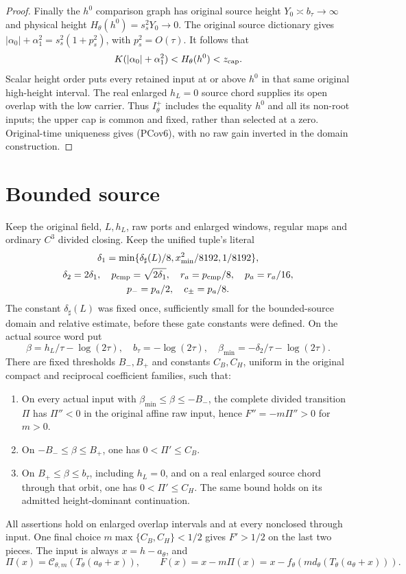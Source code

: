 \begin{proof}
Finally the $h^0$ comparison graph has original source height
$Y_0\asymp b_\tau\to\infty$ and physical height
$H_\theta(h^0)=s_s^2Y_0\to0$. The original source dictionary gives
$|\alpha_0|+\alpha_1^2=s_s^2(1+p_s^2)$, with $p_s^2=O(\tau)$.
It follows that
\[
 K(|\alpha_0|+\alpha_1^2)<H_\theta(h^0)<z_{\rm cap}.
\]
Scalar height order puts every retained input at or above $h^0$ in
that same original high-height interval. The real enlarged $h_L=0$
source chord supplies its open overlap with the low carrier. Thus
$I_\theta^+$ includes the equality $h^0$ and all its non-root inputs;
the upper cap is common and fixed, rather than selected at a zero.
Original-time uniqueness gives (PCov6), with no raw gain inverted in
the domain construction.
\end{proof}

\section{Bounded source}

\begin{lemma}
\label{p2:lem-bounded-source-budget}
Keep the original field, $L,h_L$, raw ports and enlarged windows, regular
maps and ordinary $C^3$ divided closing. Keep the unified tuple's literal
\[
 \begin{gathered}
 \delta_1=\min\{\delta_\sharp(L)/8,x_{\min}^2/8192,1/8192\},\\
 \delta_2=2\delta_1,\quad p_{\rm cmp}=\sqrt{2\delta_1},\quad r_a=p_{\rm cmp}/8,\quad p_a=r_a/16,\\
 p_-=p_a/2,\quad c_\pm=p_a/8.
 \end{gathered}
\]
The constant $\delta_\sharp(L)$ was fixed once, sufficiently small for
the bounded-source domain and relative estimate, before these gate
constants were defined. On the actual source word put
\[
 \beta=h_L/\tau-\log(2\tau),\quad b_\tau=-\log(2\tau),\quad
 \beta_{\min}=-\delta_2/\tau-\log(2\tau).
\]
There are fixed thresholds $B_-,B_+$ and constants $C_B,C_H$, uniform in
the original compact and reciprocal coefficient families, such that:
\begin{enumerate}
\item On every actual input with $\beta_{\min}\le\beta\le-B_-$,
the complete divided transition $\Pi$ has $\Pi''<0$ in the original
affine raw input, hence $F''=-m\Pi''>0$ for $m>0$.
\item On $-B_-\le\beta\le B_+$, one has $0<\Pi'\le C_B$.
\item On $B_+\le\beta\le b_\tau$, including $h_L=0$, and on a real
enlarged source chord through that orbit, one has $0<\Pi'\le C_H$.
The same bound holds on its admitted height-dominant continuation.
\end{enumerate}
All assertions hold on enlarged overlap intervals and at every nonclosed
through input. One final choice $m\max\{C_B,C_H\}<1/2$ gives $F'>1/2$
on the last two pieces. The input is always
$x=h-a_\theta$, and
\[
 \Pi(x)=\mathcal C_{\theta,m}(T_\theta(a_\theta+x)),\qquad
 F(x)=x-m\Pi(x)=x-f_\theta(m d_\theta(T_\theta(a_\theta+x))).
 \tag{BS1}
\]
\end{lemma}

